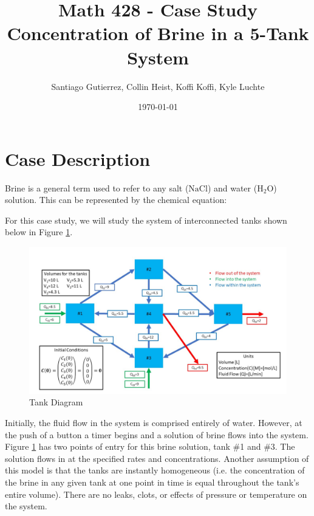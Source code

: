 \documentclass[a4paper, 12pt]{article}
\newcommand*\chem[1]{\ensuremath{\mathrm{#1}}} %
\begin{document}
\title{Math 428 - Case Study\\\large Concentration of Brine in a 5-Tank System}
\author{Santiago Gutierrez, Collin Heist, Koffi Koffi, Kyle Luchte}
\date{\today}
\maketitle
{}
\tableofcontents
\newpage
{}

\section{Case Description}
Brine is a general term used to refer to any salt (\chem{NaCl}) and water (\chem{H_2O}) solution. This can be represented by the chemical equation:
\begin{center}
\end{center}

For this case study, we will study the system of interconnected tanks shown below in Figure \ref{fig:tanks}.

\begin{figure}[H]
\centering
\includegraphics[width=.9\textwidth]{tankSystem.png}
\caption{Tank Diagram}
\label{fig:tanks}
\end{figure}

Initially, the fluid flow in the system is comprised entirely of water. However, at the push of a button a timer begins and a solution of brine flows into the system. Figure \ref{fig:tanks} has two points of entry for this brine solution, tank \#1 and \#3. The solution flows in at the specified rates and concentrations. Another assumption of this model is that the tanks are instantly homogeneous (i.e. the concentration of the brine in any given tank at one point in time is equal throughout the tank's entire volume). There are no leaks, clots, or effects of pressure or temperature on the system.
\end{document}
